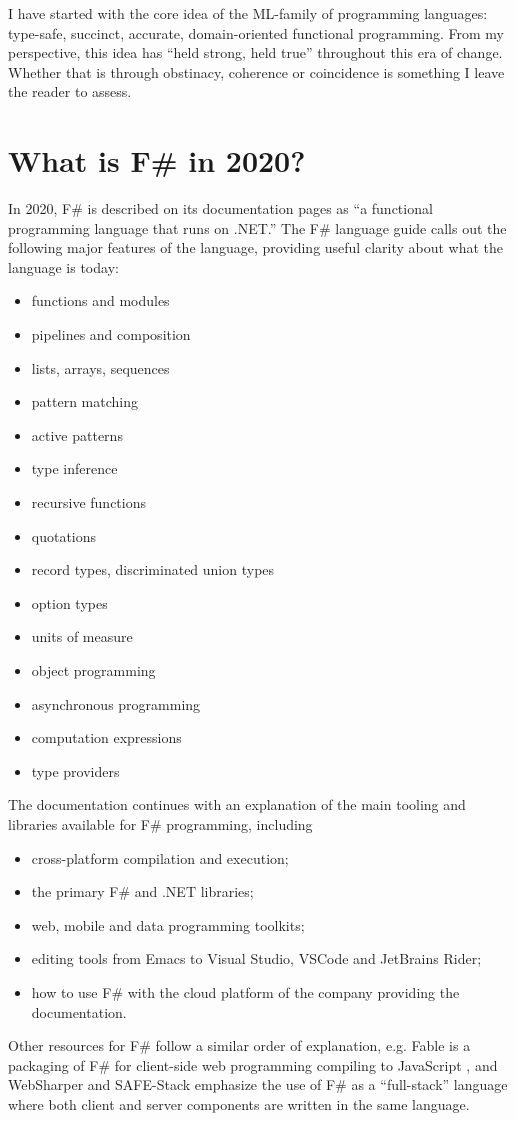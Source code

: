\documentclass[acmsmall,screen]{acmart}
\begin{document}
I have started with the core idea of the ML-family of programming languages: type-safe, succinct, accurate,
domain-oriented functional programming. From my perspective, this idea has “held strong, held true” throughout this
era of change. Whether that is through obstinacy, coherence or coincidence is something I leave the reader to assess. 

\section*{What is F\# in 2020?}

In 2020, F\# is described on its documentation pages as “a functional programming language that runs on .NET.” The F\# language guide \citep{WhatIsFSharp2020} calls out the following major features of the language, providing useful clarity about what the language is today:
\begin{itemize}
\item functions and modules
\item pipelines and composition
\item lists, arrays, sequences
\item pattern matching 
\item active patterns 
\item type inference
\item recursive functions
\item quotations
\item record types, discriminated union types
\item option types
\item units of measure
\item object programming
\item asynchronous programming
\item computation expressions
\item type providers
\end{itemize}
The documentation continues with an explanation of the main tooling and libraries available for F\# programming, including
\begin{itemize}
\item cross-platform compilation and execution;
\item the primary F\# and .NET libraries;
\item web, mobile and data programming toolkits;
\item editing tools from Emacs to Visual Studio, VSCode and JetBrains Rider;
\item how to use F\# with the cloud platform of the company providing the documentation.
\end{itemize}
Other resources for F\# follow a similar order of explanation, e.g. Fable  is a packaging of F\# for client-side web
programming compiling to JavaScript \citep{GarciaCaro2018}, and
WebSharper \citep{Granicz2020} and SAFE-Stack \citep{Abraham2020} emphasize
the use of F\# as a “full-stack” language where both client and server components are written in the
same language.
\end{document}
